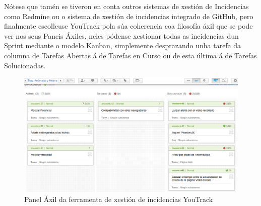     Nótese que tamén se tiveron en conta outros sistemas de xestión de Incidencias como Redmine ou
    o sistema de xestión de incidencias integrado de GitHub, pero finalmente escolleuse YouTrack 
    pola súa coherencia coa filosofía áxil que se pode ver nos seus Paneis Áxiles, neles pódense
    xestionar todas as incidencias dun Sprint mediante o modelo Kanban, simplemente desprazando unha
    tarefa da columna de Tarefas Abertas á de Tarefas en Curso ou de esta última á de Tarefas 
    Solucionadas.
    
    \begin{figure}[htp]
    \begin{center}
        \includegraphics[scale=0.4]{figures/AgilePanel.png}
        \caption{Panel Áxil da ferramenta de xestión de incidencias YouTrack}
    \label{fig:travisYml}
    \end{center}
    \end{figure}
    
    
    

